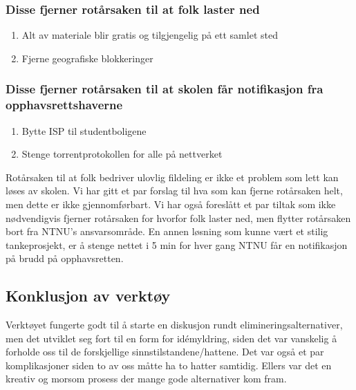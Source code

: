 \subsubsection*{Disse fjerner rotårsaken til at folk laster ned}
\begin{enumerate}
    \item Alt av materiale blir gratis og tilgjengelig på ett samlet sted
    \item Fjerne geografiske blokkeringer
\end{enumerate}
\subsubsection*{Disse fjerner rotårsaken til at skolen får notifikasjon fra opphavsrettshaverne}
\begin{enumerate}
    \item Bytte ISP til studentboligene
    \item Stenge torrentprotokollen for alle på nettverket
\end{enumerate}
Rotårsaken til at folk bedriver ulovlig fildeling er ikke et problem som lett kan løses av skolen. Vi har gitt et par forslag til hva som kan fjerne rotårsaken helt, men dette er ikke gjennomførbart. Vi har også foreslått et par tiltak som ikke nødvendigvis fjerner rotårsaken for hvorfor folk laster ned, men flytter rotårsaken bort fra NTNU's ansvarsområde.
En annen løsning som kunne vært et stilig tankeprosjekt, er å stenge nettet i 5 min for hver gang NTNU får en notifikasjon på brudd på opphavsretten. 

\subsection{Konklusjon av verktøy}
Verktøyet fungerte godt til å starte en diskusjon rundt elimineringsalternativer, men det utviklet seg fort til en form for idémyldring, siden det var vanskelig å forholde oss til de forskjellige sinnstilstandene/hattene. Det var også et par komplikasjoner siden to av oss måtte ha to hatter samtidig. Ellers var det en kreativ og morsom prosess der mange gode alternativer kom fram. 
